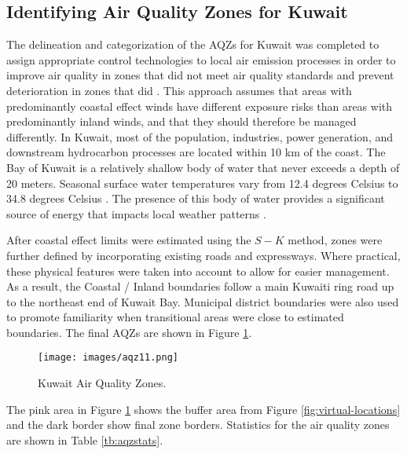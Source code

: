 \subsection{Identifying Air Quality Zones for Kuwait}

 The delineation and categorization of the AQZs for Kuwait was completed to assign appropriate control technologies to local air emission processes in order to improve air quality in zones that did not meet air quality standards and prevent deterioration in zones that did \citep{Carr2012}. This approach assumes that areas with predominantly coastal effect winds have different exposure risks than areas with predominantly inland winds, and that they should therefore be managed differently.  In Kuwait, most of the population, industries, power generation, and downstream hydrocarbon processes are located within 10 km of the coast.  The Bay of Kuwait is a relatively shallow body of water that never exceeds a depth of 20 meters.  Seasonal surface water temperatures vary from 12.4 degrees Celsius to 34.8 degrees Celsius \citep{Al-Mutairi2014}.  The presence of this body of water provides a significant source of energy that impacts local weather patterns \citep{Mizak2007,Panin2005}. 

After coastal effect limits were estimated using the $S-K$ method, zones were further defined by incorporating existing roads and expressways.  Where practical, these physical features were taken into account to allow for easier management.  As a result, the Coastal / Inland boundaries follow a main Kuwaiti ring road up to the northeast end of Kuwait Bay.  Municipal district boundaries were also used to promote familiarity when transitional areas were close to estimated boundaries.  The final AQZs are shown in Figure \ref{fig:kuwaitzones}.

%
\begin{figure}
\texttt{[image: images/aqz11.png]} 
\caption{Kuwait Air Quality Zones.}
\label{fig:kuwaitzones}
\end{figure}
%

The pink area in Figure \ref{fig:kuwaitzones} shows the buffer area from Figure \ref{fig:virtual-locations} and the dark border show final zone borders. Statistics for the air quality zones are shown in Table \ref{tb:aqzstats}.

